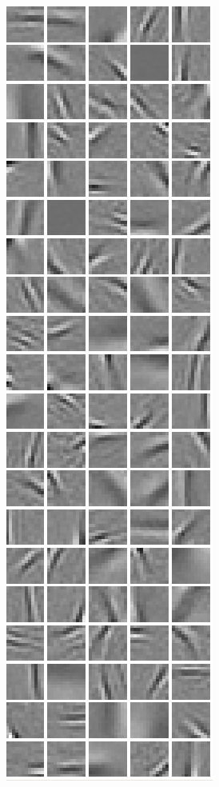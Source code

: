{\begin{figure}
\begin{subfigure}[b]{0.2\textwidth}
\includegraphics[width=\x, height=\y]{./figures/SATAE/gabors_full.png} \caption{}
\end{subfigure} \begin{subfigure}[b]{0.2\textwidth} \centering

\end{subfigure}
\end{figure}}
